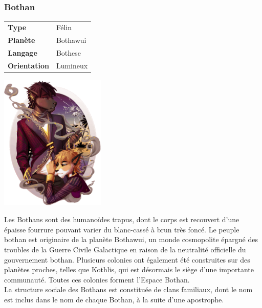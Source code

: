 \subsubsection{Bothan}

\begin{samepage}
	\begin{flushright}
		\begin{tabular}{ l l }
			\textbf{Type} 			& Félin \\
		   	\textbf{Planète} 		& Bothawui \\
		   	\textbf{Langage} 		& Bothese \\
		   	\textbf{Orientation} 	& Lumineux \\
		\end{tabular}
	\end{flushright}

	\vspace{-5\baselineskip}
	\includegraphics[width=5cm]{img/personnages/races/bothan.png}
\end{samepage}

Les Bothans sont des humanoïdes trapus, dont le corps est recouvert d’une épaisse fourrure pouvant varier du blanc-cassé à brun très foncé.
Le peuple bothan est originaire de la planète Bothawui, un monde cosmopolite épargné des troubles de la Guerre Civile Galactique en raison de la neutralité officielle du gouvernement bothan. Plusieurs colonies ont également été construites sur des planètes proches, telles que Kothlis, qui est désormais le siège d’une importante communauté. Toutes ces colonies forment l’Espace Bothan.\\
La structure sociale des Bothans est constituée de clans familiaux, dont le nom est inclus dans le nom de chaque Bothan, à la suite d’une apostrophe.

